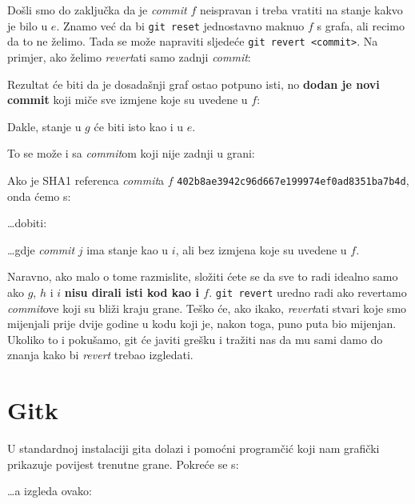 Došli smo do zaključka da je \emph{commit} $f$ neispravan i treba vratiti na stanje kakvo je bilo u $e$.
Znamo već da bi \verb+git reset+ jednostavno maknuo $f$ s grafa, ali recimo da to ne želimo.
Tada se može napraviti sljedeće \verb+git revert <commit>+. 
Na primjer, ako želimo \emph{revert}ati samo zadnji \emph{commit}:


Rezultat će biti da je dosadašnji graf ostao potpuno isti, no \textbf{dodan je novi commit} koji miče sve izmjene koje su uvedene u $f$:



Dakle, stanje u $g$ će biti isto kao i u $e$.

To se može i sa \emph{commit}om koji nije zadnji u grani:



Ako je SHA1 referenca \emph{commit}a $f$ \verb+402b8ae3942c96d667e199974ef0ad8351ba7b4d+, onda ćemo s:


\dots{}dobiti:



\dots{}gdje \emph{commit} $j$ ima stanje kao u $i$, ali bez izmjena koje su uvedene u $f$.

Naravno, ako malo o tome razmislite, složiti ćete se da sve to radi idealno samo ako $g$, $h$ i $i$ \textbf{nisu dirali isti kod kao i $f$}.
\verb+git revert+ uredno radi ako revertamo \emph{commit}ove koji su bliži kraju grane.
Teško će, ako ikako, \emph{revert}ati stvari koje smo mijenjali prije dvije godine u kodu koji je, nakon toga, puno puta bio mijenjan.
Ukoliko to i pokušamo, git će javiti grešku i tražiti nas da mu sami damo do znanja kako bi \emph{revert} trebao izgledati.

\section*{Gitk}

U standardnoj instalaciji gita dolazi i pomoćni programčić koji nam grafički prikazuje povijest trenutne grane.
Pokreće se s:


\dots{}a izgleda ovako:


